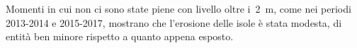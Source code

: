 Momenti in cui non ci sono state piene con livello oltre i~\SI{2}{\m}, come nei periodi 2013-2014 e 2015-2017, mostrano che l'erosione delle isole è stata modesta, di entità ben minore rispetto a quanto appena esposto.

